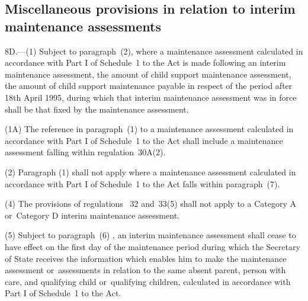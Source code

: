 \documentclass[a4paper,12pt]{article}
\begin{document}
\subsection[8D. Miscellaneous provisions in relation to interim maintenance assessments]{\sloppy Miscellaneous provisions in relation to interim maintenance assessments}

8D.—(1) Subject to paragraph~(2), where a maintenance assessment calculated in accordance with Part I of Schedule~1 to the Act is made following an interim maintenance assessment, the amount of child support maintenance assessment, the amount of child support maintenance payable in respect of the period after 18th April 1995, during which that interim maintenance assessment was in force shall be that fixed by the maintenance assessment.

(1A) The reference in paragraph~(1) to a maintenance assessment calculated in accordance with Part I of Schedule~1 to the Act shall include a maintenance assessment falling within regulation~30A(2).

(2) Paragraph (1) shall not apply where a maintenance assessment calculated in accordance with Part I of Schedule~1 to the Act falls within paragraph~(7).


(4) The provisions of regulations~
32 and~33(5)  %
shall not apply to a Category A or~Category D interim maintenance assessment.

(5) Subject to paragraph~(6)%
, an interim maintenance assessment shall cease to have effect on the first day of the maintenance period during which the Secretary of State receives the information which enables 
him  %
to make the maintenance assessment or~assessments in relation to the same absent parent, person with care, and qualifying child or~qualifying children, calculated in accordance with Part I of Schedule~1 to the Act.
\end{document}
